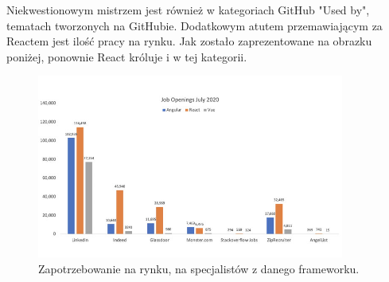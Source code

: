 \documentclass[12pt]{article}
\begin{document}
\begin{sloppypar}
{{    Niekwestionowym mistrzem jest również w kategoriach GitHub "Used by", tematach tworzonych na GitHubie.\cite{frontend-popularity} Dodatkowym atutem przemawiającym za Reactem jest 
    ilość pracy na rynku. Jak zostało zaprezentowane na obrazku poniżej, ponownie React króluje i w tej kategorii. 
    \begin{figure}[H]
      \centering
      \includegraphics[width=0.9\textwidth]{frontend_jobs.jpg}
      \caption{Zapotrzebowanie na rynku, na specjalistów z danego frameworku.\cite{accenture}}
      \label{fig:frontend-jobs}
    \end{figure}
  }
}
\end{sloppypar}
\end{document}
